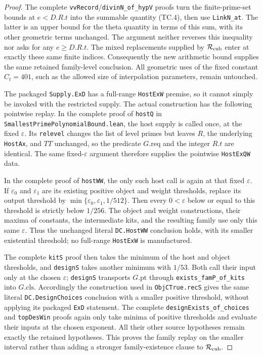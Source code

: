 \begin{proof}
The complete \texttt{vvRecord}/\texttt{divinN\_of\_hypV}
proofs turn the finite-prime-set bounds at $e<D.R.t$ into
the summable quantity (TC.4), then use \texttt{LinkN\_at}.
The latter is an upper bound for the theta quantity in terms
of this sum, with its other geometric terms unchanged.
The argument neither reverses this inequality nor asks for
any $e\geq D.R.t$.  The mixed replacements supplied by
$\mathcal R_{\rm cub}$ enter at exactly these same finite
indices.  Consequently the new arithmetic bound supplies
the same retained family-level conclusion.  All geometric
uses of the fixed constant $C_t=401$, such as the allowed
size of interpolation parameters, remain untouched.

The packaged \texttt{Supply.ExD} has a full-range
\texttt{HostExW} premise, so it cannot simply be invoked with
the restricted supply.  The actual construction has the following
pointwise replay.  In the complete proof of \texttt{hostQ} in
\texttt{SmallestPrimePolynomialBound.lean}, the host supply is
called once, at the fixed $\varepsilon$.  Its \texttt{relevel}
changes the list of level primes but leaves $R$, the underlying
\texttt{HostAx}, and $TT$ unchanged, so the predicate
$G.\mathrm{req}$ and the integer $R.t$ are identical.
The same fixed-$\varepsilon$ argument therefore supplies the
pointwise \texttt{HostExQW} data.

In the complete proof of \texttt{hostWW}, the only such host call
is again at that fixed $\varepsilon$.  If $\varepsilon_0$ and
$\varepsilon_1$ are its existing positive object and weight
thresholds, replace its output threshold by
$\min\{\varepsilon_0,\varepsilon_1,1/512\}$.  Then every
$0<\varepsilon$ below or equal to this threshold is strictly
below $1/256$.  The object and weight constructions, their maxima
of constants, the intermediate kits, and the resulting family
use only this same $\varepsilon$.  Thus the unchanged literal
\texttt{DC.HostWW} conclusion holds, with its smaller existential
threshold; no full-range \texttt{HostExW} is manufactured.

The complete \texttt{kitS} proof then takes the minimum of the
host and object thresholds, and \texttt{designS} takes another
minimum with $1/53$.  Both call their input only at the chosen
$\varepsilon$; \texttt{designS} transports $G.\mathrm{pt}$ through
\texttt{exists\_famP\_of\_kits} into $G.\mathrm{cls}$.
Accordingly the construction used in \texttt{ObjCTrue.recS}
gives the same literal \texttt{DC.DesignChoices} conclusion
with a smaller positive threshold, without applying its packaged
\texttt{ExD} statement.  The complete
\texttt{designExists\_of\_choices} and \texttt{topDesWin} proofs
again only take minima of positive thresholds and evaluate their
inputs at the chosen exponent.  All their other source hypotheses
remain exactly the retained hypotheses.  This proves the family
replay on the smaller interval rather than adding a stronger
family-existence clause to $\mathcal R_{\rm cub}$.


\end{proof}
